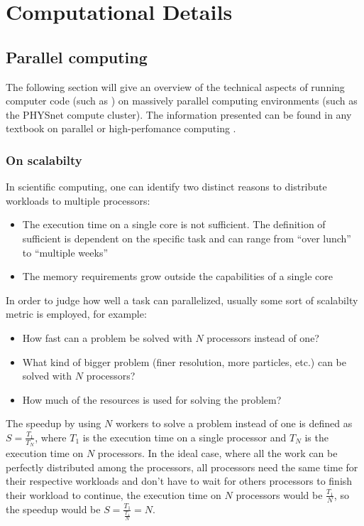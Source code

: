 \documentclass[main.tex]{subfiles}
\begin{document}
\chapter{Computational Details\label{ch:computation}}

\section{Parallel computing\label{sec:parallel_computing}}

The following section will give an overview of the technical aspects of running computer code (such as \QE) on massively parallel computing environments (such as the PHYSnet compute cluster).
The information presented can be found in any textbook on parallel or high-perfomance computing \cite{hager_introduction_2010}.


\subsection{On scalabilty}

In scientific computing, one can identify two distinct reasons to distribute workloads to multiple processors:
\begin{itemize}
    \item The execution time on a single core is not sufficient. The definition of sufficient is dependent on the specific task and can range from \enquote{over lunch} to \enquote{multiple weeks}
    \item The memory requirements grow outside the capabilities of a single core
\end{itemize}
In order to judge how well a task can parallelized, usually some sort of scalabilty metric is employed, for example:
\begin{itemize}
    \item How fast can a problem be solved with \(N\) processors instead of one?
    \item What kind of bigger problem (finer resolution, more particles, etc.) can be solved with \(N\) processors?
    \item How much of the resources is used for solving the problem?
\end{itemize}
The speedup by using \(N\) workers to solve a problem instead of one is defined as \(S = \frac{T_1}{T_N}\), where \(T_1\) is the execution time on a single processor and \(T_N\) is the execution time on \(N\) processors.
In the ideal case, where all the work can be perfectly distributed among the processors, all processors need the same time for their respective workloads and don't have to wait for others processors to finish their workload to continue, the execution time on \(N\) processors would be \(\frac{T_1}{N}\), so the speedup would be \(S = \frac{T_1}{\frac{T_1}{N}} = N\).
\end{document}
